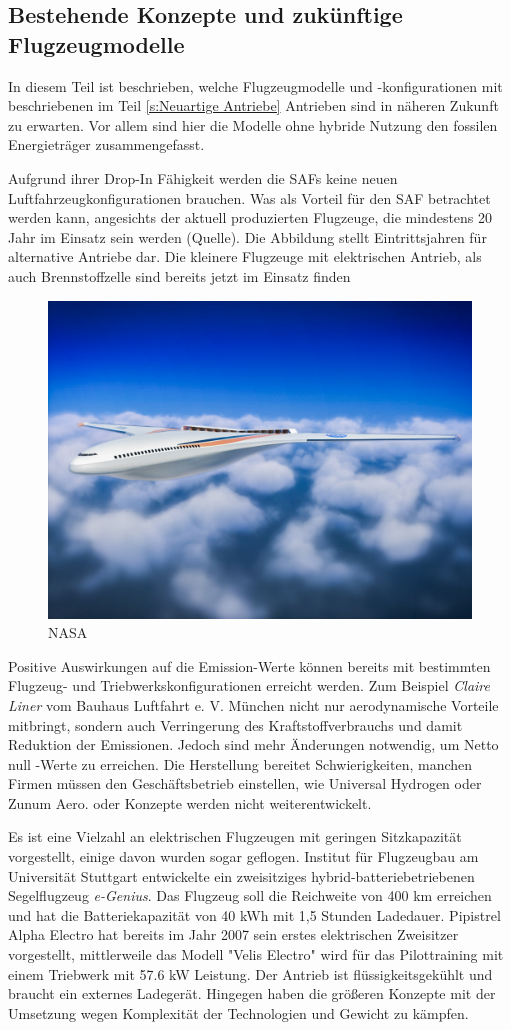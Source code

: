 \subsection{Bestehende Konzepte und zukünftige Flugzeugmodelle}
In diesem Teil ist beschrieben, welche Flugzeugmodelle und -konfigurationen mit beschriebenen im Teil \ref{s:Neuartige Antriebe} Antrieben
sind in näheren Zukunft zu erwarten. Vor allem sind hier die Modelle ohne hybride Nutzung den fossilen Energieträger zusammengefasst.

Aufgrund ihrer Drop-In Fähigkeit werden die SAFs keine neuen Luftfahrzeugkonfigurationen brauchen. Was als Vorteil für den SAF betrachtet werden kann,
angesichts der aktuell produzierten Flugzeuge, die mindestens 20 Jahr im Einsatz sein werden (Quelle).
Die Abbildung stellt Eintrittsjahren für alternative Antriebe dar.
Die kleinere Flugzeuge mit elektrischen Antrieb, als auch Brennstoffzelle sind bereits jetzt im Einsatz finden
%
\begin{figure}[h]
	\centering
	\includegraphics[width=0.6\linewidth]{Bilder/NASA.jpg}
	\caption[NASA]{NASA}
	\label{NASA_konfig}
\end{figure}
%
Positive Auswirkungen auf die Emission-Werte können bereits mit bestimmten Flugzeug- und Triebwerkskonfigurationen erreicht werden.
Zum Beispiel \textit{Claire Liner} vom Bauhaus Luftfahrt e. V. München nicht nur aerodynamische Vorteile mitbringt, 
sondern auch Verringerung des Kraftstoffverbrauchs und damit Reduktion der Emissionen.
Jedoch sind mehr Änderungen notwendig, um Netto null -Werte zu erreichen.
Die Herstellung bereitet Schwierigkeiten, manchen Firmen müssen den Geschäftsbetrieb einstellen, wie Universal Hydrogen oder Zunum Aero.
oder Konzepte werden nicht weiterentwickelt.

Es ist eine Vielzahl an elektrischen Flugzeugen mit geringen Sitzkapazität vorgestellt, einige davon wurden sogar geflogen.
Institut für Flugzeugbau am Universität Stuttgart entwickelte ein zweisitziges hybrid-batteriebetriebenen Segelflugzeug \textit{e-Genius}. Das Flugzeug soll
die Reichweite von 400 km erreichen und hat die Batteriekapazität von 40 kWh mit 1,5 Stunden Ladedauer. %
Pipistrel Alpha Electro hat bereits im Jahr 2007 sein erstes elektrischen Zweisitzer vorgestellt, mittlerweile das Modell "Velis Electro" \cite{Pipistrel_VelisElectro} wird
für das Pilottraining mit einem Triebwerk mit 57.6 kW Leistung. Der Antrieb ist flüssigkeitsgekühlt und braucht ein externes Ladegerät.
Hingegen haben die größeren Konzepte mit der Umsetzung wegen Komplexität der Technologien und Gewicht zu kämpfen.\\



